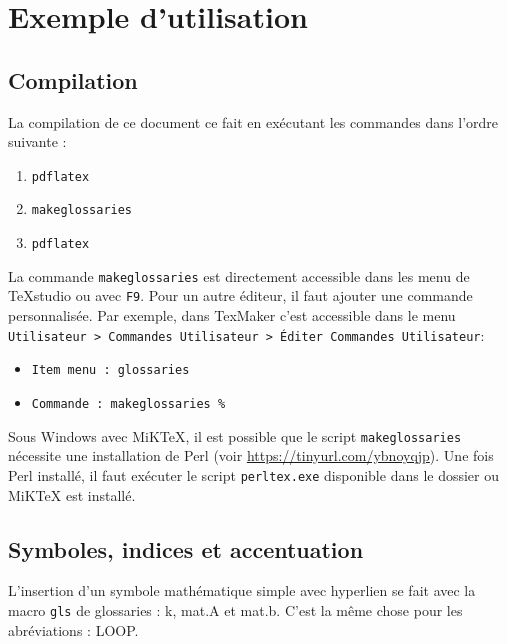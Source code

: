 \documentclass[PhD,nohyperref,english,french]{ulthese}
\begin{document}
\frontmatter                    %

\pagetitre

\begin{SingleSpace}
\abnormalparskip{0pt}
\printglossary[title=Nomenclature]
\end{SingleSpace}
\cleardoublepage

\mainmatter                     %

\chapter{Exemple d'utilisation}

\section{Compilation}
La compilation de ce document ce fait en exécutant les commandes dans l'ordre suivante :
\begin{enumerate}
	\item \texttt{pdflatex}
	\item \texttt{makeglossaries}
	\item \texttt{pdflatex}
\end{enumerate}
La commande \texttt{makeglossaries} est directement accessible dans les menu de TeXstudio ou avec \texttt{F9}. Pour un autre éditeur, il faut ajouter une commande personnalisée. Par exemple, dans TexMaker c’est accessible dans le menu \texttt{Utilisateur > Commandes Utilisateur > Éditer Commandes Utilisateur}:
\begin{itemize}
	\item \texttt{Item menu : glossaries} 
	\item \texttt{Commande : makeglossaries \%}
\end{itemize}
Sous Windows avec MiKTeX, il est possible que le script \texttt{makeglossaries} nécessite une installation de Perl (voir \url{https://tinyurl.com/ybnoyqjp}). Une fois Perl installé, il faut exécuter le script \texttt{perltex.exe} disponible dans le dossier ou MiKTeX est installé.

\section{Symboles, indices et accentuation}
L'insertion d'un symbole mathématique simple avec hyperlien se fait avec la macro \texttt{gls} de glossaries : \gls{k}, \gls{mat.A} et \gls{mat.b}. C'est la même chose pour les abréviations : \gls{LOOP}. 
\end{document}
